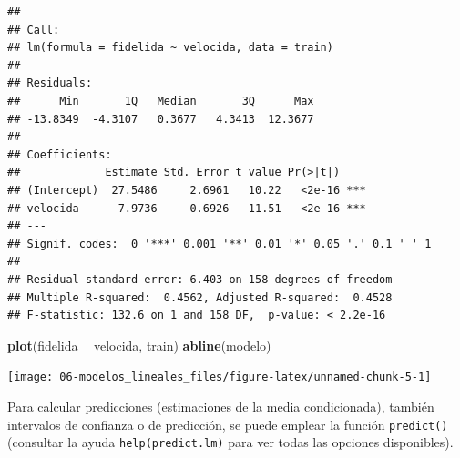 \documentclass[
  spanish,
]{book}
\newenvironment{Shaded}{\begin{snugshade}}{\end{snugshade}}
\newcommand{\KeywordTok}[1]{\textcolor[rgb]{0.13,0.29,0.53}{\textbf{#1}}}
\newcommand{\NormalTok}[1]{#1}
\newcommand{\OperatorTok}[1]{\textcolor[rgb]{0.81,0.36,0.00}{\textbf{#1}}}
\newcommand{\StringTok}[1]{\textcolor[rgb]{0.31,0.60,0.02}{#1}}
\theoremstyle{break}
\theoremstyle{definition}
\theoremstyle{definition}
\theoremstyle{definition}
\theoremstyle{remark}
\begin{document}
\begin{verbatim}
## 
## Call:
## lm(formula = fidelida ~ velocida, data = train)
## 
## Residuals:
##      Min       1Q   Median       3Q      Max 
## -13.8349  -4.3107   0.3677   4.3413  12.3677 
## 
## Coefficients:
##             Estimate Std. Error t value Pr(>|t|)    
## (Intercept)  27.5486     2.6961   10.22   <2e-16 ***
## velocida      7.9736     0.6926   11.51   <2e-16 ***
## ---
## Signif. codes:  0 '***' 0.001 '**' 0.01 '*' 0.05 '.' 0.1 ' ' 1
## 
## Residual standard error: 6.403 on 158 degrees of freedom
## Multiple R-squared:  0.4562, Adjusted R-squared:  0.4528 
## F-statistic: 132.6 on 1 and 158 DF,  p-value: < 2.2e-16
\end{verbatim}

\begin{Shaded}
\begin{Highlighting}[]
\KeywordTok{plot}\NormalTok{(fidelida }\OperatorTok{~}\StringTok{ }\NormalTok{velocida, train)}
\KeywordTok{abline}\NormalTok{(modelo)}
\end{Highlighting}
\end{Shaded}

\begin{center}\texttt{[image: 06-modelos\_lineales\_files/figure-latex/unnamed-chunk-5-1]} \end{center}

Para calcular predicciones (estimaciones de la media condicionada), también intervalos de confianza o de predicción, se puede emplear la función \texttt{predict()} (consultar la ayuda \texttt{help(predict.lm)} para ver todas las opciones disponibles).
\end{document}

